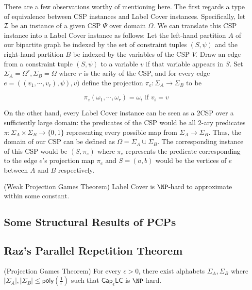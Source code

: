 There are a few observations worthy of mentioning here. The first regards a type of equivalence between CSP instances and Label Cover instances. Specifically, let $\mathcal{I}$ be an instance of a given CSP $\Psi$ over domain $\Omega$. We can translate this CSP instance into a Label Cover instance as follows: Let the left-hand partition $A$ of our bipartite graph be indexed by the set of constraint tuples $(S,\psi)$ and the right-hand partition $B$ be indexed by the variables of the CSP $V$. Draw an edge from a constraint tuple $(S,\psi)$ to a variable $v$ if that variable appears in $S$. Set $\Sigma_A = \Omega^r, \Sigma_B = \Omega$ where $r$ is the arity of the CSP, and for every edge $e = ((v_1,\cdots,v_r), \psi), v)$ define the projection $\pi_e:\Sigma_A \rightarrow \Sigma_B$ to be

\[ \pi_e(\omega_1, \cdots, \omega_r) =  \omega_i \text{ if } v_i = v\]\newline


On the other hand, every Label Cover instance can be seen as a $2$CSP over a sufficiently large domain: the predicates of the CSP would be all $2$-ary predicates $\pi:\Sigma_A \times \Sigma_B \rightarrow \{0,1\}$ representing every possible map from $\Sigma_A \rightarrow \Sigma_B$. Thus, the domain of our CSP can be defined as $\Omega = \Sigma_A \cup \Sigma_B$. The corresponding instance of this CSP would be $(S,\pi_e)$ where $\pi_e$ represents the predicate corresponding to the edge $e$'s projection map $\pi_e$ and $S = (a,b)$ would be the vertices of $e$ between $A$ and $B$ respectively.

\begin{theorem} (Weak Projection Games Theorem)
Label Cover is $\NP$-hard to approximate within some constant.
\end{theorem}


\subsection{Some Structural Results of PCPs}


\subsection{Raz's Parallel Repetition Theorem}

\begin{theorem} (Projection Games Theorem)
  For every $\epsilon > 0$, there exist alphabets $\Sigma_A, \Sigma_B$ where $|\Sigma_A|,|\Sigma_B| \leq \mathsf{poly}(\frac{1}{\epsilon})$ such that $\mathsf{Gap}_\epsilon\mathsf{LC}$ is $\NP$-hard.
\end{theorem}
